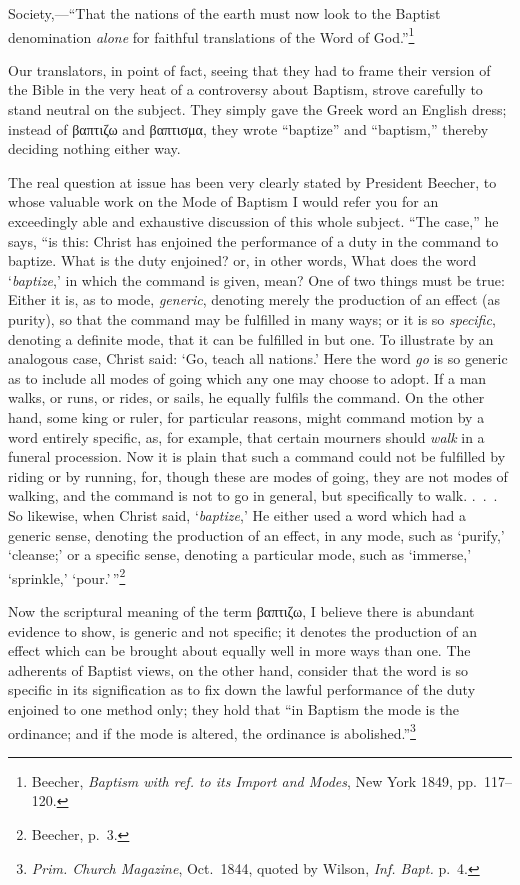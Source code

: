 \documentclass[
]{book}
\begin{document}
Society,---``That the nations of the earth must now look to the Baptist denomination \emph{alone} for faithful translations of the Word of God.''\footnote{Beecher, \emph{Baptism with ref. to its Import and Modes}, New York 1849, pp.~117--120.}

Our translators, in point of fact, seeing that they had to frame their version of the Bible in the very heat of a controversy about Baptism, strove carefully to stand neutral on the subject. They simply gave the Greek word an English dress; instead of \foreignlanguage{greek}{βαπτιζω} and \foreignlanguage{greek}{βαπτισμα}, they wrote ``baptize'' and ``baptism,'' thereby deciding nothing either way.

The real question at issue has been very clearly stated by President Beecher, to whose valuable work on the Mode of Baptism I would refer you for an exceedingly able and exhaustive discussion of this whole subject. ``The case,'' he says, ``is this: Christ has enjoined the performance of a duty in the command to baptize. What is the duty enjoined? or, in other words, What does the word `\emph{baptize},' in which the command is given, mean? One of two things must be true: Either it is, as to mode, \emph{generic}, denoting merely the production of an effect (as purity), so that the command may be fulfilled in many ways; or it is so \emph{specific}, denoting a definite mode, that it can be fulfilled in but one. To illustrate by an analogous case, Christ said: `Go, teach all nations.' Here the word \emph{go} is so generic as to include all modes of going which any one may choose to adopt. If a man walks, or runs, or rides, or sails, he equally fulfils the command. On the other hand, some king or ruler, for particular reasons, might command motion by a word entirely specific, as, for example, that certain mourners should \emph{walk} in a funeral procession. Now it is plain that such a command could not be fulfilled by riding or by running, for, though these are modes of going, they are not modes of walking, and the command is not to go in general, but specifically to walk. .~.~. So likewise, when Christ said, `\emph{baptize},' He either used a word which had a generic sense, denoting the production of an effect, in any mode, such as `purify,' `cleanse;' or a specific sense, denoting a particular mode, such as `immerse,' `sprinkle,' `pour.'\,''\footnote{Beecher, p.~3.}

Now the scriptural meaning of the term \foreignlanguage{greek}{βαπτιζω}, I believe there is abundant evidence to show, is generic and not specific; it denotes the production of an effect which can be brought about equally well in more ways than one. The adherents of Baptist views, on the other hand, consider that the word is so specific in its signification as to fix down the lawful performance of the duty enjoined to one method only; they hold that ``in Baptism the mode is the ordinance; and if the mode is altered, the ordinance is abolished.''\footnote{\emph{Prim. Church Magazine}, Oct.~1844, quoted by Wilson, \emph{Inf. Bapt.} p.~4.}
\end{document}
